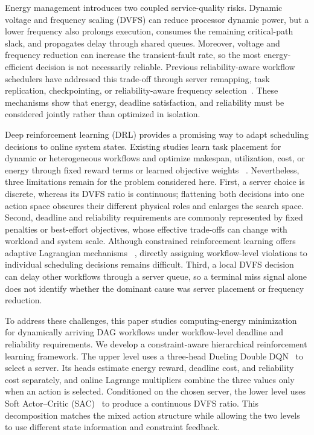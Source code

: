 \documentclass[lettersize,journal]{IEEEtran}
\begin{document}
Energy management introduces two coupled service-quality risks. Dynamic
voltage and frequency scaling (DVFS) can reduce processor dynamic power, but a
lower frequency also prolongs execution, consumes the remaining critical-path
slack, and propagates delay through shared queues. Moreover, voltage and
frequency reduction can increase the transient-fault rate, so the most
energy-efficient decision is not necessarily reliable. Previous
reliability-aware workflow schedulers have addressed this trade-off through
server remapping, task replication, checkpointing, or reliability-aware
frequency selection~\cite{zhang2017,wu2018,hassan2020,wu2023}. These mechanisms
show that energy, deadline satisfaction, and reliability must be considered
jointly rather than optimized in isolation.

Deep reinforcement learning (DRL) provides a promising way to adapt scheduling
decisions to online system states. Existing studies learn task placement for
dynamic or heterogeneous workflows and optimize makespan, utilization, cost,
or energy through fixed reward terms or learned objective weights
~\cite{jayanetti2022,chen2023,pan2024,wen2026}. Nevertheless, three limitations
remain for the problem considered here. First, a server choice is discrete,
whereas its DVFS ratio is continuous; flattening both decisions into one action
space obscures their different physical roles and enlarges the search space.
Second, deadline and reliability requirements are commonly represented by
fixed penalties or best-effort objectives, whose effective trade-offs can
change with workload and system scale. Although constrained reinforcement
learning offers adaptive Lagrangian mechanisms
~\cite{achiam2017,tessler2019,stooke2020}, directly assigning workflow-level
violations to individual
scheduling decisions remains difficult. Third, a local DVFS decision can delay
other workflows through a server queue, so a terminal miss signal alone does
not identify whether the dominant cause was server placement or frequency
reduction.

To address these challenges, this paper studies computing-energy minimization
for dynamically arriving DAG workflows under workflow-level deadline and
reliability requirements. We develop a constraint-aware hierarchical
reinforcement learning framework. The upper level uses a three-head Dueling
Double DQN~\cite{vanhasselt2016,wang2016dueling} to select a server. Its heads
estimate energy reward, deadline cost, and reliability cost separately, and
online Lagrange multipliers combine the three values only when an action is
selected. Conditioned on the chosen server, the lower level uses Soft
Actor--Critic (SAC)~\cite{haarnoja2018} to produce a continuous DVFS ratio.
This decomposition matches the mixed action structure while allowing the two
levels to use different state information and constraint feedback.
\end{document}
